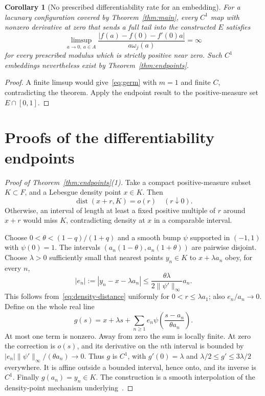 \documentclass[11pt]{article}
\newtheorem{corollary}[theorem]{Corollary}
\theoremstyle{remark}\newtheorem{remark}[theorem]{Remark}
\begin{document}
\begin{corollary}[No prescribed differentiability rate for an embedding]
For a lacunary configuration covered by Theorem~\ref{thm:main}, every $C^1$ map with nonzero derivative at zero that sends a full tail into the constructed $E$ satisfies
\[
 \limsup_{a\to0,\ a\in A}
 \frac{|f(a)-f(0)-f'(0)a|}{a\omega_j(a)}=\infty
\]
for every prescribed modulus which is strictly positive near zero. Such $C^1$ embeddings nevertheless exist by Theorem~\ref{thm:endpoints}.
\end{corollary}
\begin{proof}
A finite limsup would give~\eqref{eq:germ} with $m=1$ and finite $C$, contradicting the theorem. Apply the endpoint result to the positive-measure set $E\cap[0,1]$.
\end{proof}

\section{Proofs of the differentiability endpoints}
\begin{proof}[Proof of Theorem~\ref{thm:endpoints}(1)]
Take a compact positive-measure subset $K\subset F$, and a Lebesgue density point $x\in K$. Then
\begin{equation}\label{eq:density-distance}
 \operatorname{dist}(x+r,K)=o(r)\quad(r\downarrow0).
\end{equation}
Otherwise, an interval of length at least a fixed positive multiple of $r$ around $x+r$ would miss $K$, contradicting density at $x$ in a comparable interval.

Choose $0<\theta<(1-q)/(1+q)$ and a smooth bump $\psi$ supported in $(-1,1)$ with $\psi(0)=1$. The intervals
$(a_n(1-\theta),a_n(1+\theta))$ are pairwise disjoint. Choose $\lambda>0$ sufficiently small that nearest points $y_n\in K$ to $x+\lambda a_n$ obey, for every $n$,
\[
 |e_n|:=|y_n-x-\lambda a_n|
 \le\frac{\theta\lambda}{2\|\psi'\|_\infty}a_n.
\]
This follows from~\eqref{eq:density-distance} uniformly for $0<r\le\lambda a_1$; also $e_n/a_n\to0$. Define on the whole real line
\[
 g(s)=x+\lambda s+\sum_{n\ge1}e_n
                  \psi\left(\frac{s-a_n}{\theta a_n}\right).
\]
At most one term is nonzero. Away from zero the sum is locally finite. At zero the correction is $o(s)$, and its derivative on the $n$th interval is bounded by $|e_n|\|\psi'\|_\infty/(\theta a_n)\to0$. Thus $g$ is $C^1$, with $g'(0)=\lambda$ and $\lambda/2\le g'\le3\lambda/2$ everywhere. It is affine outside a bounded interval, hence onto, and its inverse is $C^1$. Finally $g(a_n)=y_n\in K$. The construction is a smooth interpolation of the density-point mechanism underlying~\cite[Theorem 1.1]{FLX}.
\end{proof}
\end{document}
